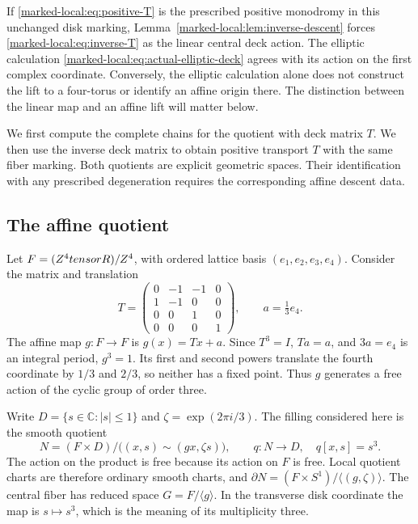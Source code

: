 If \eqref{marked-local:eq:positive-T} is the prescribed positive monodromy in
this unchanged disk marking, Lemma~\ref{marked-local:lem:inverse-descent}
forces \eqref{marked-local:eq:inverse-T} as the linear central deck action.
The elliptic calculation \eqref{marked-local:eq:actual-elliptic-deck} agrees
with its action on the first complex coordinate. Conversely, the
elliptic calculation alone does not construct the lift to a
four-torus or identify an affine origin there. The distinction
between the linear map and an affine lift will matter below.

We first compute the complete chains for the quotient with deck
matrix $T$. We then use the inverse deck matrix to obtain positive
transport $T$ with the same fiber marking. Both quotients are
explicit geometric spaces. Their identification with any prescribed
degeneration requires the corresponding affine descent data.


\subsection{The affine quotient}

Let $F=(Z^4tensorR)/Z^4$, with ordered lattice basis
$(e_1,e_2,e_3,e_4)$. Consider the matrix and translation
\begin{equation}\label{marked-local:eq:native-data}
 T=\begin{pmatrix}
 0&-1&-1&0\\1&-1&0&0\\0&0&1&0\\0&0&0&1
 \end{pmatrix},\qquad a=\tfrac13e_4.
\end{equation}
The affine map $g:F\to F$ is $g(x)=Tx+a$.
Since $T^3=I$, $Ta=a$, and $3a=e_4$ is an integral period,
$g^3=1$. Its first and second powers translate the fourth coordinate
by $1/3$ and $2/3$, so neither has a fixed point. Thus $g$ generates
a free action of the cyclic group of order three.

Write $D=\{s\in\mathbb C:|s|\le1\}$ and
$\zeta=\exp(2\pi i/3)$. The filling considered here is the smooth
quotient
\begin{equation}\label{marked-local:eq:filling}
 N=(F\times D)/\bigl((x,s)\sim(gx,\zeta s)\bigr),
 \qquad q:N\longrightarrow D,\quad q[x,s]=s^3.
\end{equation}
The action on the product is free because its action on $F$ is free.
Local quotient charts are therefore ordinary smooth charts, and
$\partial N=(F\times S^1)/\langle(g,\zeta)\rangle$.
The central fiber has reduced space $G=F/\langle g\rangle$.
In the transverse disk coordinate the map is $s\mapsto s^3$, which
is the meaning of its multiplicity three.

